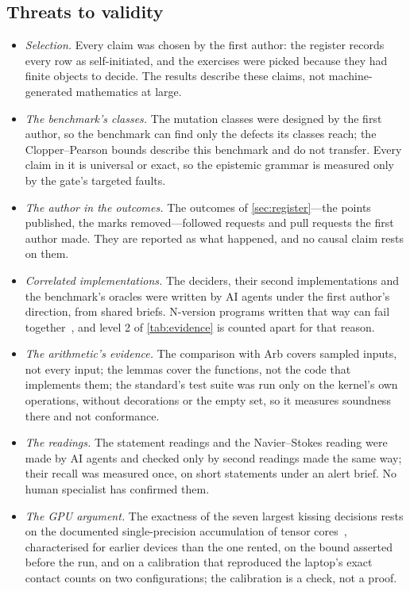 \documentclass[preprint,11pt,a4paper]{elsarticle}
\theoremstyle{definition}
\begin{document}
\subsection{Threats to validity}\label{sec:threats}

\begin{itemize}\setlength{\itemsep}{1pt}
\item \emph{Selection.} Every claim was chosen by the first author: the register records every row as self-initiated, and the exercises were picked because they had finite objects to decide. The results describe these claims, not machine-generated mathematics at large.
\item \emph{The benchmark's classes.} The mutation classes were designed by the first author, so the benchmark can find only the defects its classes reach; the Clopper--Pearson bounds describe this benchmark and do not transfer. Every claim in it is universal or exact, so the epistemic grammar is measured only by the gate's targeted faults.
\item \emph{The author in the outcomes.} The outcomes of \cref{sec:register}---the points published, the marks removed---followed requests and pull requests the first author made. They are reported as what happened, and no causal claim rests on them.
\item \emph{Correlated implementations.} The deciders, their second implementations and the benchmark's oracles were written by AI agents under the first author's direction, from shared briefs. N-version programs written that way can fail together~\citep{KnightLeveson86,Nogueira26,Ron26}, and level 2 of \cref{tab:evidence} is counted apart for that reason.
\item \emph{The arithmetic's evidence.} The comparison with Arb covers sampled inputs, not every input; the lemmas cover the functions, not the code that implements them; the standard's test suite was run only on the kernel's own operations, without decorations or the empty set, so it measures soundness there and not conformance.
\item \emph{The readings.} The statement readings and the Navier--Stokes reading were made by AI agents and checked only by second readings made the same way; their recall was measured once, on short statements under an alert brief. No human specialist has confirmed them.
\item \emph{The GPU argument.} The exactness of the seven largest kissing decisions rests on the documented single-precision accumulation of tensor cores~\citep{Fasi21,Blanchard20,HighamMary22}, characterised for earlier devices than the one rented, on the bound asserted before the run, and on a calibration that reproduced the laptop's exact contact counts on two configurations; the calibration is a check, not a proof.
\end{itemize}
\end{document}
